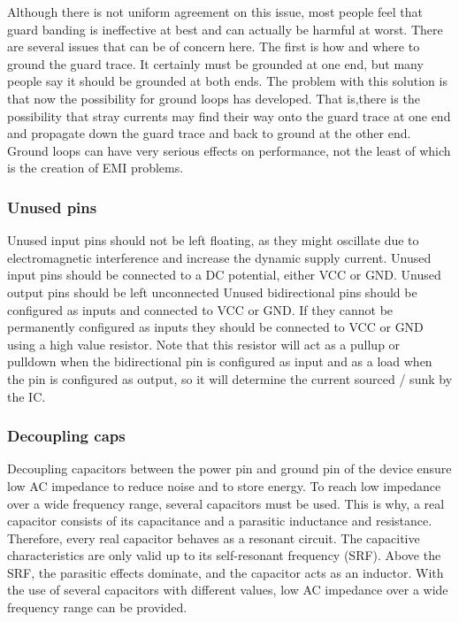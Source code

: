\documentclass[final]{cubedoc}
\begin{document}
	Although there is not uniform agreement on this issue, most people feel that
	guard banding is ineffective at best and can actually be harmful at worst.
	There are several issues that can be of concern here. The first is how and
	where to ground the guard trace. It certainly must be grounded at one end,
	but many people say it should be grounded at both ends. The problem with
	this solution is that now the possibility for ground loops has developed. That is,there is the possibility that stray currents may find their way onto the guard trace at one end and propagate down the guard trace and back to ground at the other end. Ground loops can have very serious effects on performance, not the least of which is the creation of EMI problems.
	
	
	\subsubsection{Unused pins}
	Unused input pins should not be left floating, as they might oscillate due to
	electromagnetic interference and increase the dynamic supply current. Unused input pins should be connected to a DC potential, either VCC or GND.
	Unused output pins should be left unconnected Unused bidirectional pins should be configured as inputs and connected to VCC or GND. If they cannot be permanently configured as inputs they should be connected to VCC or GND using a high value resistor. Note that this resistor will act as a pullup or pulldown when the bidirectional pin is configured as input and as a load when the pin is configured as output, so it will determine the current sourced / sunk by the IC.
	
	\subsubsection{Decoupling caps}
	Decoupling capacitors between the power pin and ground pin of the device ensure low AC impedance to reduce noise and to store energy. To reach low impedance over a wide frequency range, several capacitors must be used. This is why, a real capacitor consists of its capacitance and a parasitic inductance and resistance. Therefore, every real capacitor behaves as a resonant circuit. The capacitive characteristics are only valid up to its self-resonant frequency (SRF). Above the SRF, the parasitic effects dominate, and the capacitor acts as an inductor. With the use of several capacitors with different values, low AC impedance over a wide frequency range can be provided.
	
\end{document}
